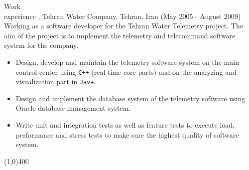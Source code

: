 \documentclass{resume}
\begin{document}
\begin{category}{Work \\experience}
, Tehran Water Company, Tehran, Iran (May 2005 - August 2009)\\
Working as a software developer for the Tehran Water Telemetry project. The aim of the 
project is to implement the telemetry and telecommand software system for the company.
\begin{itemize}
 \item Design, develop and maintain the telemetry software system on the main control center using 
       \texttt{C++} (real time core parts) and on the analyzing and visualization part in \texttt{Java}.
 \item Design and implement the database system of the telemetry software 
       using Oracle database management system.
 \item Write unit and integration tests as well as feature tests to execute load, performance and stress tests
       to make sure the highest quality of software system.
\end{itemize}

\end{category}

\begin{center}
\line(1,0){400}
\end{center}


\end{document}
